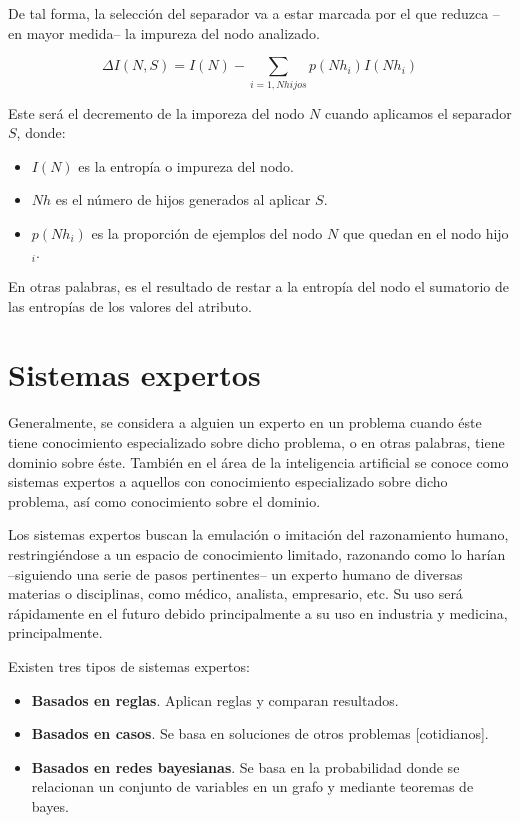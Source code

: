 \documentclass[a4paper, 11pt, titlepage]{article}
\begin{document}
            De tal forma, la selección del separador va a estar marcada por el que reduzca --en 
            mayor medida-- la impureza del nodo analizado.

            \[\Delta I(N,S)=I(N)-\displaystyle\sum_{i=1,Nhijos} p (Nh_i) I (Nh_i)\]

            Este será el decremento de la imporeza del nodo $N$ cuando aplicamos el separador $S$, donde:
            
            \begin{itemize}
                \item $I(N)$ es la entropía o impureza del nodo.
                \item $Nh$ es el número de hijos generados al aplicar $S$.
                \item $p(Nh_i)$ es la proporción de ejemplos del nodo $N$ que quedan en el nodo hijo $_i$.
            \end{itemize}

            En otras palabras, es el resultado de restar a la entropía del nodo el sumatorio de las 
            entropías de los valores del atributo.
            
\section{Sistemas expertos}

    Generalmente, se considera a alguien un experto en un problema cuando éste tiene
    conocimiento especializado sobre dicho problema, o en otras palabras, tiene dominio 
    sobre éste.  También en el área de la inteligencia artificial se conoce como 
    sistemas expertos a aquellos con conocimiento especializado sobre dicho problema, así 
    como conocimiento sobre el dominio.

    Los sistemas expertos buscan la emulación o imitación del razonamiento humano, 
    restringiéndose a un espacio de conocimiento limitado, razonando como lo harían
    --siguiendo una serie de pasos pertinentes-- un experto humano de diversas materias 
    o disciplinas, como médico, analista, empresario, etc. Su uso será rápidamente en el 
    futuro debido principalmente a su uso en industria y medicina, principalmente.

    Existen tres tipos de sistemas expertos:

    \begin{itemize}
        \item \textbf{Basados en reglas}. Aplican reglas y comparan resultados.
        \item \textbf{Basados en casos}. Se basa en soluciones de otros problemas [cotidianos].
        \item \textbf{Basados en redes bayesianas}. Se basa en la probabilidad donde se relacionan 
        un conjunto de variables en un grafo y mediante teoremas de bayes.
    \end{itemize}
\end{document}
